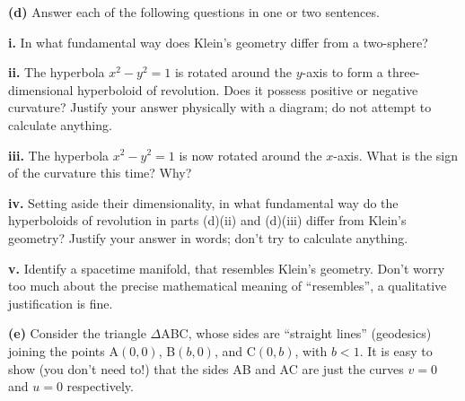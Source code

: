 \documentclass[a4paper]{article} %
\begin{document}
\pagebreak %

\begin{framed}
\textbf{(d)} Answer each of the following questions in one or two sentences.
\end{framed}

\begin{framed}
\textbf{i.} In what fundamental way does Klein’s geometry differ from a two-sphere?
\end{framed}

\pagebreak %

\begin{framed}
\textbf{ii.} The hyperbola $x^2-y^2=1$ is rotated around the $y$-axis to form a three-dimensional hyperboloid of revolution. Does it possess positive or negative curvature? Justify your answer physically with a diagram; do not attempt to calculate anything.
\end{framed}

\pagebreak %

\begin{framed}
\textbf{iii.} The hyperbola $x^2-y^2=1$ is now rotated around the $x$-axis. What is the sign of the curvature this time? Why?
\end{framed}

\pagebreak %

\begin{framed}
\textbf{iv.} Setting aside their dimensionality, in what fundamental way do the hyperboloids of revolution in parts (d)(ii) and (d)(iii) differ from Klein's geometry? Justify your answer in words; don’t try to calculate anything.
\end{framed}

\pagebreak %

\begin{framed}
\textbf{v.} Identify a spacetime manifold, that resembles Klein's geometry. Don’t worry too much about the precise mathematical meaning of ``resembles'', a qualitative justification is fine.
\end{framed}

\pagebreak %

\begin{framed}
\textbf{(e)} Consider the triangle $\Delta$ABC, whose sides are ``straight lines'' (geodesics) joining the points A$(0,0)$, B$(b,0)$, and C$(0,b)$, with $b<1$. It is easy to show (you don't need to!) that the sides AB and AC are just the curves $v=0$ and $u=0$ respectively.
\end{framed}
\end{document}
